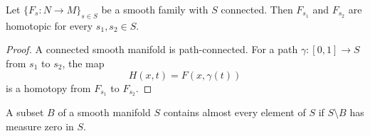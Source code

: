 \begin{proposition}
\label{prop:6-34}




Let $\{F_s:N\to M\}_{s\in S}$ be a smooth family with $S$ connected. Then $F_{s_1}$ and $F_{s_2}$ are homotopic for every $s_1,s_2\in S$.
\end{proposition}

\begin{proof}

\sketch A connected smooth manifold is path-connected. For a path $\gamma:[0,1]\to S$ from $s_1$ to $s_2$, the map
\[
H(x,t)=F(x,\gamma(t))
\]
is a homotopy from $F_{s_1}$ to $F_{s_2}$.
\end{proof}

\begin{definition}
\label{def:6-44-extra-3}




A subset $B$ of a smooth manifold $S$ contains almost every element of $S$ if $S\setminus B$ has measure zero in $S$.
\end{definition}
